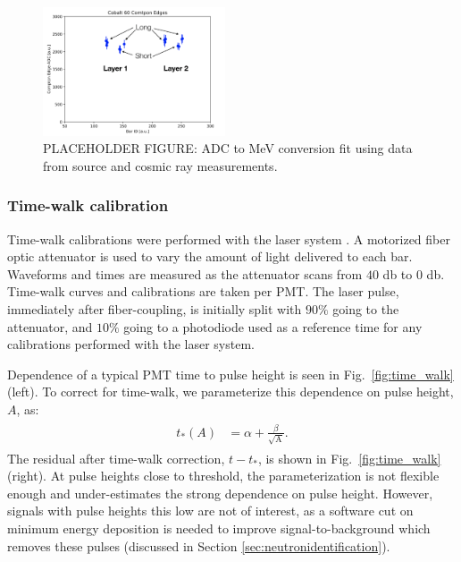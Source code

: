 \documentclass[3p,final,twocolumn]{elsarticle}
\begin{document}
\begin{figure}[tbh]
	\centering
			\includegraphics[width=0.48\textwidth]{coedges.png}
	\caption{PLACEHOLDER FIGURE: ADC to MeV conversion fit using data from source and cosmic ray measurements.}
	\label{fig:mev_conversion}
\end{figure}

\subsubsection{Time-walk calibration}
Time-walk calibrations were performed with the laser system \cite{band-laser}. A motorized fiber optic attenuator is used to vary
the amount of light delivered to each bar. Waveforms and times are measured as the attenuator scans from $40$ \si{\decibel} to $0$ 
\si{\decibel}. Time-walk curves and calibrations are taken per PMT. The laser pulse, immediately after fiber-coupling, is initially 
split with $90\%$ going to the attenuator, and $10\%$ going to a photodiode used as a reference time for any calibrations 
performed with the laser system.

Dependence of a typical PMT time to pulse height is seen in Fig.~\ref{fig:time_walk} (left). To correct for time-walk, we parameterize 
this dependence on pulse height, $A$, as:
\begin{eqnarray}
	\begin{split}
		t_*(A)	&= \alpha + \frac{\beta}{\sqrt{\textrm{A}}}.				
		\label{eqn:time_walk}
	\end{split}
\end{eqnarray}
The residual after time-walk correction, $t-t_*$, is shown in Fig.~\ref{fig:time_walk} (right). At pulse heights close to threshold, the 
parameterization is not flexible enough and under-estimates the strong dependence on pulse height. However, signals with pulse 
heights this low are not of interest, as a software cut on minimum energy deposition is needed to improve signal-to-background 
which removes these pulses (discussed in Section \ref{sec:neutronidentification}).
\end{document}
